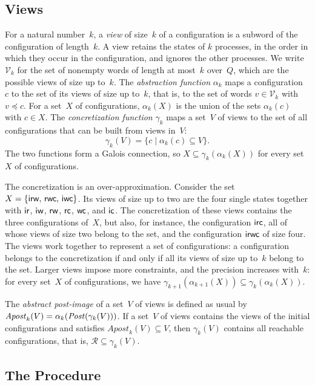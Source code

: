 \subsection{Views}

For a natural number~$k$, a \emph{view} of size~$k$ of a configuration is a
subword of the configuration of length~$k$. A view retains the states of $k$
processes, in the order in which they occur in the configuration, and ignores
the other processes. We write $\mathcal{V}_k$ for the set of nonempty words of
length at most~$k$ over~$Q$, which are the possible views of size up to~$k$. The
\emph{abstraction function} $\alpha_k$ maps a configuration~$c$ to the set of
its views of size up to~$k$, that is, to the set of words $v \in
\mathcal{V}_k$ with $v \preceq c$. For a set~$X$ of configurations, $\alpha_k(X)$
is the union of the sets $\alpha_k(c)$ with $c \in X$. The \emph{concretization
function} $\gamma_k$ maps a set~$V$ of views to the set of all configurations
that can be built from views in~$V$:
\[
\gamma_k(V) = \{ c \mid \alpha_k(c) \subseteq V \} .
\]
The two functions form a Galois connection, so $X \subseteq
\gamma_k(\alpha_k(X))$ for every set~$X$ of configurations.

The concretization is an over-approximation. Consider the set $X =
\{\mathsf{i}\mathsf{r}\mathsf{w},\, \mathsf{r}\mathsf{w}\mathsf{c},\, \mathsf{i}\mathsf{w}\mathsf{c}\}$. Its views of size up
to two are the four single states together with $\mathsf{i}\mathsf{r}$, $\mathsf{i}\mathsf{w}$,
$\mathsf{r}\mathsf{w}$, $\mathsf{r}\mathsf{c}$, $\mathsf{w}\mathsf{c}$, and $\mathsf{i}\mathsf{c}$. The concretization of
these views contains the three configurations of~$X$, but also, for instance,
the configuration $\mathsf{i}\mathsf{r}\mathsf{c}$, all of whose views of size two belong to
the set, and the configuration $\mathsf{i}\mathsf{r}\mathsf{w}\mathsf{c}$ of size four. The views
work together to represent a set of configurations: a configuration belongs to
the concretization if and only if all its views of size up to~$k$ belong to
the set. Larger views impose more
constraints, and the precision increases with~$k$: for every set~$X$ of
configurations, we have $\gamma_{k+1}(\alpha_{k+1}(X)) \subseteq
\gamma_k(\alpha_k(X))$.

The \emph{abstract post-image} of a set~$V$ of views is defined as usual by
$\mathit{Apost}_k(V) = \alpha_k(\mathit{Post}(\gamma_k(V)))$. If a set~$V$ of views
contains the views of the initial configurations and satisfies
$\mathit{Apost}_k(V) \subseteq V$, then $\gamma_k(V)$ contains all reachable
configurations, that is, $\mathcal{R} \subseteq \gamma_k(V)$.

\subsection{The Procedure}

